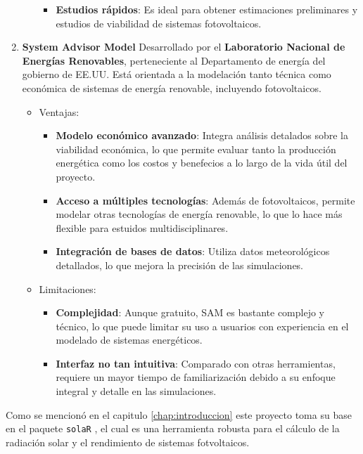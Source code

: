 \begin{enumerate}
\begin{itemize}
\begin{itemize}
\item \textbf{Estudios rápidos}: Es ideal para obtener estimaciones preliminares y estudios de viabilidad de sistemas fotovoltaicos.
\end{itemize}
\end{itemize}
\item \textbf{System Advisor Model} \cite{sam}
Desarrollado por el \textbf{Laboratorio Nacional de Energías Renovables}, perteneciente al Departamento de energía del gobierno de EE.UU. Está orientada a la modelación tanto técnica como económica de sistemas de energía renovable, incluyendo fotovoltaicos.
\begin{itemize}
\item Ventajas:
\begin{itemize}
\item \textbf{Modelo económico avanzado}: Integra análisis detalados sobre la viabilidad económica, lo que permite evaluar tanto la producción energética como los costos y benefecios a lo largo de la vida útil del proyecto.
\item \textbf{Acceso a múltiples tecnologías}: Además de fotovoltaicos, permite modelar otras tecnologías de energía renovable, lo que lo hace más flexible para estuidos multidisciplinares.
\item \textbf{Integración de bases de datos}: Utiliza datos meteorológicos detallados, lo que mejora la precisión de las simulaciones.
\end{itemize}
\item Limitaciones:
\begin{itemize}
\item \textbf{Complejidad}: Aunque gratuito, SAM es bastante complejo y técnico, lo que puede limitar su uso a usuarios con experiencia en el modelado de sistemas energéticos.
\item \textbf{Interfaz no tan intuitiva}: Comparado con otras herramientas, requiere un mayor tiempo de familiarización debido a su enfoque integral y detalle en las simulaciones.
\end{itemize}
\end{itemize}
\end{enumerate}

Como se mencionó en el capitulo \ref{chap:introduccion} este proyecto toma su base en el paquete \texttt{solaR} \cite{perpinan12}, el cual es una herramienta robusta para el cálculo de la radiación solar y el rendimiento de sistemas fotvoltaicos.

